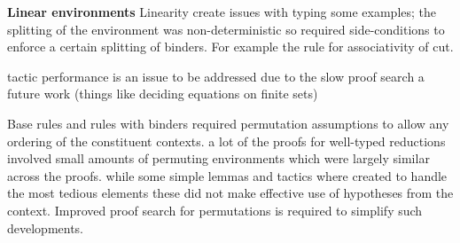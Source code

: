 \textbf{Linear environments} Linearity create issues with typing some
examples; the splitting of the environment was non-deterministic so required
side-conditions to enforce a certain splitting of binders. For example the
rule for associativity of cut. 

tactic performance is an issue to be addressed due to the slow proof search a
future work (things like deciding equations on finite sets)

Base rules and rules with binders required permutation assumptions to allow
any ordering of the constituent contexts. a lot of the proofs for well-typed
reductions involved small amounts of permuting environments which were largely
similar across the proofs. while some simple lemmas and tactics where created
to handle the most tedious elements these did not make effective use of
hypotheses from the context. Improved proof search for permutations is
required to simplify such developments.
